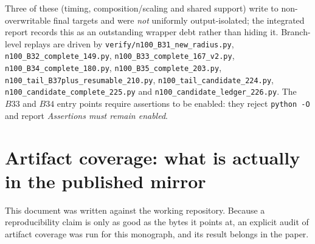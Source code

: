 Three of these (timing, composition/scaling and shared support) write to non-overwritable final
targets and were \emph{not} uniformly output-isolated; the integrated report records this as an
outstanding wrapper debt rather than hiding it. Branch-level replays are driven by
\texttt{verify/\allowbreak{}n100\_\allowbreak{}B31\_\allowbreak{}new\_\allowbreak{}radius.py}, \texttt{n100\_\allowbreak{}B32\_\allowbreak{}complete\_\allowbreak{}149.py},
\texttt{n100\_\allowbreak{}B33\_\allowbreak{}complete\_\allowbreak{}167\_\allowbreak{}v2.py}, \texttt{n100\_\allowbreak{}B34\_\allowbreak{}complete\_\allowbreak{}180.py},
\texttt{n100\_\allowbreak{}B35\_\allowbreak{}complete\_\allowbreak{}203.py}, \texttt{n100\_\allowbreak{}tail\_\allowbreak{}B37plus\_\allowbreak{}resumable\_\allowbreak{}210.py},
\texttt{n100\_\allowbreak{}tail\_\allowbreak{}candidate\_\allowbreak{}224.py}, \texttt{n100\_\allowbreak{}candidate\_\allowbreak{}complete\_\allowbreak{}225.py} and
\texttt{n100\_\allowbreak{}candidate\_\allowbreak{}ledger\_\allowbreak{}226.py}. The $B33$ and $B34$ entry points require assertions to be
enabled: they reject \texttt{python -\allowbreak{}O} and report \emph{Assertions must remain enabled}.

\section{Artifact coverage: what is actually in the published mirror}

This document was written against the working repository. Because a reproducibility claim is only
as good as the bytes it points at, an explicit audit of artifact coverage was run for this
monograph, and its result belongs in the paper.

